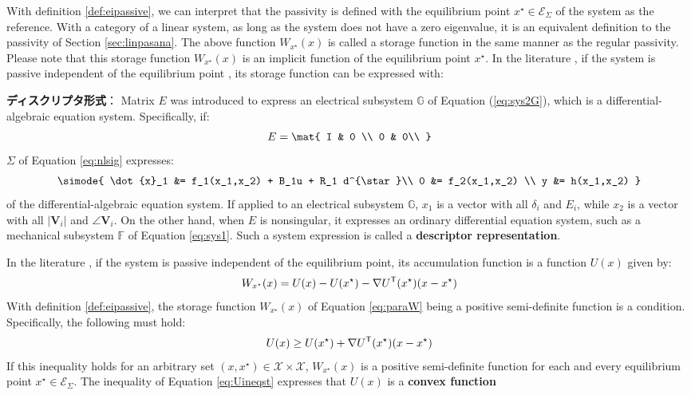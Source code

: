 \documentclass[graybox, envcountchap]{svmult}
\begin{document}
With definition \ref{def:eipassive}, we can interpret that the passivity is defined with the equilibrium point $x^{\star} \in \mathcal{E}_{\Sigma}$ of the system as the reference.
With a category of a linear system, as long as the system does not have a zero eigenvalue, it is an equivalent definition to the passivity of Section \ref{sec:linpasana}.
The above function $W_{x^{\star}}(x)$ is called a storage function in the same manner as the regular passivity.
Please note that this storage function $W_{x^{\star}}(x)$ is an implicit function of the equilibrium point $x^{\star}$.  In the literature \cite{simpson2019equilibrium}, if the system is passive independent of the equilibrium point , its storage function can be expressed with:

\begin{COLUMN}
\noindent \textbf{ディスクリプタ形式}：
Matrix $E$ was introduced to express an electrical subsystem $\mathds{G}$ of Equation (\ref{eq:sys2G}), which is a differential-algebraic equation system.
Specifically, if:
\[
E=\mat{
I & 0 \\
0 & 0\\ 
}
\]
$\Sigma$ of Equation \ref{eq:nlsig} expresses:
\begin{align*}
\simode{
\dot{x}_1 &= f_1(x_1,x_2) + B_1u + R_1 d^{\star}\\
0 &= f_2(x_1,x_2) \\
y &= h(x_1,x_2)
}
\end{align*}
of the differential-algebraic equation system.
If applied to an electrical subsystem $\mathds{G}$, $x_1$ is a vector with all $\delta_i$ and $E_i$, while $x_2$ is a vector with all $|\bm{V}_i|$ and $\angle \bm{V}_i$.
On the other hand, when $E$ is nonsingular, it expresses an ordinary differential equation system, such as a mechanical subsystem $\mathds{F}$ of Equation \ref{eq:sys1}.
Such a system expression is called a \textbf{descriptor representation}. 
\end{COLUMN}

In the literature \cite{simpson2019equilibrium}, if the system is passive independent of the equilibrium point, its accumulation function is a function $U(x)$ given by:
\begin{align}\label{eq:paraW}
W_{x^{\star}}(x) = U(x) - U(x^{\star}) - \nabla U^{\sf T}(x^{\star}) (x-x^{\star})
\end{align}
With definition \ref{def:eipassive}, the storage function $W_{x^{\star}}(x)$ of Equation \ref{eq:paraW} being a positive semi-definite function is a condition.
Specifically, the following must hold:
\begin{align}\label{eq:Uineqst}
U(x) \geq  U(x^{\star}) + \nabla U^{\sf T}(x^{\star}) (x-x^{\star})
\end{align}
If this inequality holds for an arbitrary set $(x,x^{\star}) \in \mathcal{X} \times \mathcal{X}$, $W_{x^{\star}}(x)$ is a positive semi-definite function for each and every equilibrium point $x^{\star} \in \mathcal{E}_{\Sigma}$.
The inequality of Equation \ref{eq:Uineqst} expresses that $U(x)$ is a \textbf{convex function}
\end{document}
